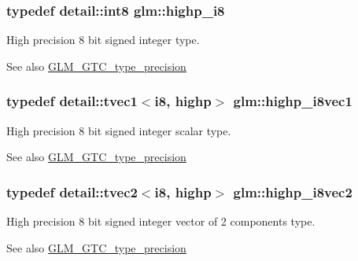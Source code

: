 \subsubsection[{\texorpdfstring{highp\+\_\+i8}{highp_i8}}]{\setlength{\rightskip}{0pt plus 5cm}typedef detail\+::int8 {\bf glm\+::highp\+\_\+i8}}\hypertarget{group__gtc__type__precision_ga8b9eb0b24cce7f14478bfcacb53ce839}{}\label{group__gtc__type__precision_ga8b9eb0b24cce7f14478bfcacb53ce839}
High precision 8 bit signed integer type. \begin{DoxySeeAlso}{See also}
\hyperlink{group__gtc__type__precision}{G\+L\+M\+\_\+\+G\+T\+C\+\_\+type\+\_\+precision} 
\end{DoxySeeAlso}
\subsubsection[{\texorpdfstring{highp\+\_\+i8vec1}{highp_i8vec1}}]{\setlength{\rightskip}{0pt plus 5cm}typedef detail\+::tvec1$<$i8, highp$>$ {\bf glm\+::highp\+\_\+i8vec1}}\hypertarget{group__gtc__type__precision_ga0334353753f93388bcc89f91c9aff476}{}\label{group__gtc__type__precision_ga0334353753f93388bcc89f91c9aff476}
High precision 8 bit signed integer scalar type. \begin{DoxySeeAlso}{See also}
\hyperlink{group__gtc__type__precision}{G\+L\+M\+\_\+\+G\+T\+C\+\_\+type\+\_\+precision} 
\end{DoxySeeAlso}
\subsubsection[{\texorpdfstring{highp\+\_\+i8vec2}{highp_i8vec2}}]{\setlength{\rightskip}{0pt plus 5cm}typedef detail\+::tvec2$<$i8, highp$>$ {\bf glm\+::highp\+\_\+i8vec2}}\hypertarget{group__gtc__type__precision_ga2224945795a870e41d951f0847d54f02}{}\label{group__gtc__type__precision_ga2224945795a870e41d951f0847d54f02}
High precision 8 bit signed integer vector of 2 components type. \begin{DoxySeeAlso}{See also}
\hyperlink{group__gtc__type__precision}{G\+L\+M\+\_\+\+G\+T\+C\+\_\+type\+\_\+precision} 
\end{DoxySeeAlso}
